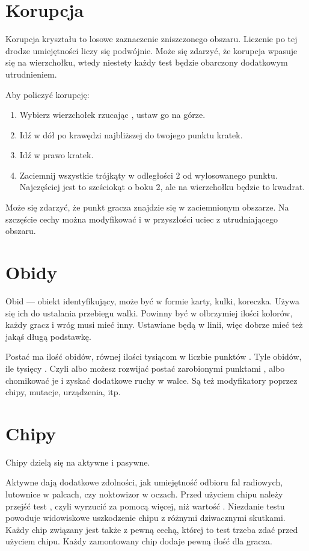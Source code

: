 \section{Korupcja}
Korupcja kryształu to losowe zaznaczenie zniszczonego obszaru.
Liczenie po tej drodze umiejętności liczy się podwójnie.
Może się zdarzyć, że korupcja wpasuje się na wierzchołku, wtedy niestety każdy test będzie obarczony dodatkowym utrudnieniem.

Aby policzyć korupcję:
\begin{enumerate}
 \item Wybierz wierzchołek rzucając \dvi{}, ustaw go na górze.
 \item Idź w dół po krawędzi najbliższej do twojego punktu \dxx{} kratek.
 \item Idź w prawo \dxx[2]{} kratek.
 \item Zaciemnij wszystkie trójkąty w odległości 2 od wylosowanego punktu. Najczęściej jest to sześciokąt o boku 2, ale na wierzchołku będzie to kwadrat.
\end{enumerate}
Może się zdarzyć, że punkt gracza znajdzie się w zaciemnionym obszarze. 
Na szczęście cechy można modyfikować i w przyszłości uciec z utrudniającego obszaru.

\section{Obidy}
Obid --- obiekt identyfikujący, może być w formie karty, kulki, koreczka.
Używa się ich do ustalania przebiegu walki.
Powinny być w olbrzymiej ilości kolorów, każdy gracz i wróg musi mieć inny.
Ustawiane będą w linii, więc dobrze mieć też jakąś długą podstawkę.

Postać ma ilość obidów, równej ilości tysiącom w liczbie punktów \xpmcn{}.
Tyle obidów, ile tysięcy \xpmcn{}.
Czyli albo możesz rozwijać postać zarobionymi punktami \xpmcn{}, albo chomikować je i zyskać dodatkowe ruchy w walce.
Są też modyfikatory poprzez chipy, mutacje, urządzenia, itp.

\section{Chipy}
Chipy dzielą się na aktywne i pasywne.

Aktywne dają dodatkowe zdolności, jak umiejętność odbioru fal radiowych, lutownice w palcach, czy noktowizor w oczach.
Przed użyciem chipu należy przejść test \abnkp{}, czyli wyrzucić za pomocą \dxx{} więcej, niż wartość \abnkp{}. 
Niezdanie testu \abnkp{} powoduje widowiskowe uszkodzenie chipu z różnymi dziwacznymi skutkami.
Każdy chip związany jest także z pewną cechą, której to test trzeba zdać przed użyciem chipu.
Każdy zamontowany chip dodaje pewną ilość \abnkp{} dla gracza.

